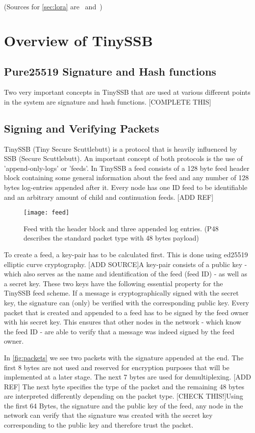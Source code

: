 (Sources for \cref{sec:lora} are~\cite{10.1007/978-3-030-01168-0_11} and~\cite{10.1145/3293534})

\section{Overview of TinySSB}
\subsection{Pure25519 Signature and Hash functions}
Two very important concepts in TinySSB that are used at various different points in the system are signature and hash functions. [COMPLETE THIS]
\subsection{Signing and Verifying Packets}
\label{sec:signing}
TinySSB (Tiny Secure Scuttlebutt) is a protocol that is heavily influenced by SSB (Secure Scuttlebutt). An important concept of both protocols is the use of 'append-only-logs' or 'feeds'. In TinySSB a feed consists of a 128 byte feed header block containing some general information about the feed and any number of 128 bytes log-entries appended after it. Every node has one ID feed to be identifiable and an arbitrary amount of child and continuation feeds. [ADD REF]
\begin{figure}
\centering
\texttt{[image: feed]}
\caption{Feed with the header block and three appended log entries. (P48 describes the standard packet type with 48 bytes payload)}
\label{fig:feed}
\end{figure}

To create a feed, a key-pair has to be calculated first. This is done using ed25519 elliptic curve cryptography. [ADD SOURCE]A key-pair consists of a public key - which also serves as the name and identification of the feed (feed ID) - as well as a secret key. These two keys have the following essential property for the TinySSB feed scheme. If a message is cryptographically signed with the secret key, the signature can (only) be verified with the corresponding public key. Every packet that is created and appended to a feed has to be signed by the feed owner with his secret key. This ensures that other nodes in the network - which know the feed ID - are able to verify that a message was indeed signed by the feed owner.

In \cref{fig:packets} we see two packets with the signature appended at the end. The first 8 bytes are not used and reserved for encryption purposes that will be implemented at a later stage. The next 7 bytes are used for demultiplexing. [ADD REF] The next byte specifies the type of the packet and the remaining 48 bytes are interpreted differently depending on the packet type. [CHECK THIS!]Using the first 64 Bytes, the signature and the public key of the feed, any node in the network can verify that the signature was created with the secret key corresponding to the public key and therefore trust the packet.\\

